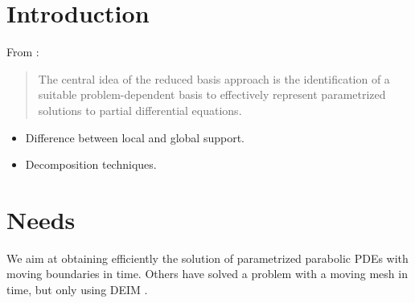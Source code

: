 \documentclass[../main.tex]{subfiles}
\begin{document}

        




\section{Introduction}

From  \cite{2016_CertifiedReducedBasisMethodsParametrizedPDE_Hesthaven}:
\begin{quotation}
    The central idea of the reduced basis approach is the identification of a suitable problem-dependent basis to effectively represent parametrized solutions to partial differential equations.
\end{quotation}

\begin{itemize}
    \item Difference between local and global support.
    \item Decomposition techniques.
\end{itemize}

\section{Needs}
We aim at obtaining efficiently the solution of parametrized parabolic PDEs with moving boundaries in time.
Others have solved a problem with a moving mesh in time, but only using DEIM \cite{2018_podDeimReducedOrderModelDeformingMeshAeroelasticApplications_Donfrancesco}.
\end{document}
